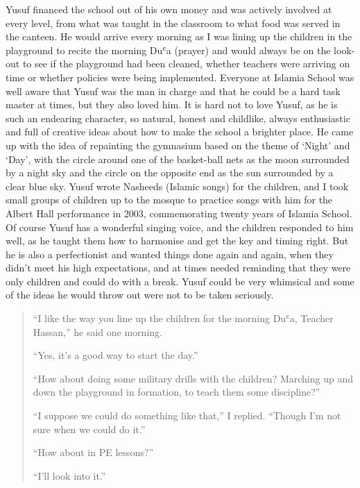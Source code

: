 \documentclass[12pt]{memoir}
\def\`{ʿ} %
\newcommand{\cor}[2]{#2} %
\begin{document}
Yusuf financed the school out of his own money
and was actively involved at every level,
from what was taught in the classroom to what food was served in the canteen.
He would arrive every morning as I was lining up the children
in the playground to recite the morning Du\`a (prayer)
and would always be on the look-out to see if the playground had been cleaned,
whether teachers were arriving on time
or whether policies were being implemented.
Everyone at Islamia School was well aware that Yusuf was the man in charge
and that he could be a hard task master at times, but they also loved him.
It is hard not to love Yusuf, as he is such an endearing character,
so natural, honest and childlike,
always enthusiastic and full of creative ideas
about how to make the school a brighter place.
He came up with the idea of \cor{re-painting}{repainting} the gymnasium
based on the theme of ‘Night’ and ‘Day’,
with the circle around one of the basket-ball nets
as the moon surrounded by a night sky and the circle on the opposite end
as the sun surrounded by a clear blue sky.
Yusuf wrote Nasheeds (Islamic songs) for the children,
and I took small groups of children up to the mosque to practice songs
with him for the Albert Hall performance in 2003,
commemorating twenty years of Islamia School.
Of course Yusuf has a wonderful singing voice,
and the children responded to him well,
as he taught them how to harmonise and get the key and timing right.
But he is also a perfectionist and wanted things done again and again,
when they didn’t meet his high expectations,
and at times needed reminding that they were only children
and could do with a break.
Yusuf could be very whimsical and some of the ideas
he would throw out were not to be taken seriously.

\begin{quote}
“I like the way you line up the children for the morning Du\`a,
Teacher Hassan,” he said one morning.

“Yes, it’s a good way to start the day.”

“How about doing some military drills with the children?
Marching up and down the playground in formation,
to teach them some discipline?”

“I suppose we could do something like that,” I replied.
“Though I’m not sure when we could do it.”

“How about in PE lessons?”

“I’ll look into it.”
\end{quote}
\end{document}
